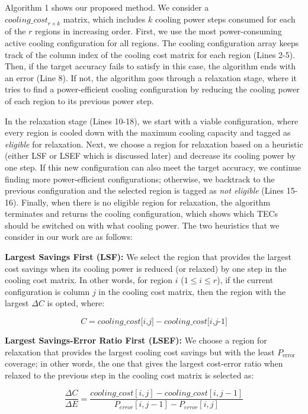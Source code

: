 \documentclass[sigconf]{acmart}
\begin{document}
Algorithm 1 shows our proposed method. We consider a \\ $\textit{cooling\_cost}_{r \times k}$ matrix, which includes \( k \) cooling power steps consumed for each of the \( r \) regions in increasing order. First, we use the most power-consuming active cooling configuration for all regions. The cooling configuration array keeps track of the column index of the cooling cost matrix for each region (Lines 2-5). Then, if the target accuracy fails to satisfy in this case, the algorithm ends with an error (Line 8). If not, the algorithm goes through a relaxation stage, where it tries to find a power-efficient cooling configuration by reducing the cooling power of each region to its previous power step.

In the relaxation stage (Lines 10-18), we start with a viable configuration, where every region is cooled down with the maximum cooling capacity and tagged as \textit{eligible} for relaxation. Next, we choose a region for relaxation based on a heuristic (either LSF or LSEF which is discussed later) and decrease its cooling power by one step. If this new configuration can also meet the target accuracy, we continue finding more power-efficient configurations; otherwise, we backtrack to the previous configuration and the selected region is tagged as \textit{not eligible} (Lines 15-16). Finally, when there is no eligible region for relaxation, the algorithm terminates and returns the cooling configuration, which shows which TECs should be switched on with what cooling power. The two heuristics that we consider in our work are as follows:

\textbf{Largest Savings First (LSF):} We select the region that provides the largest cost savings when its cooling power is reduced (or relaxed) by one step in the cooling cost matrix. In other words, for region \( i \) (\( 1 \leq i \leq r \)), if the current configuration is column \( j \) in the cooling cost matrix, then the region with the largest \( \Delta C \) is opted, where:

\[
C = \textit{cooling\_cost[i,j]} - \textit{cooling\_cost[i,j-1]} \tag{2}
\]

\textbf{Largest Savings-Error Ratio First (LSEF):} We choose a region for relaxation that provides the largest cooling cost savings but with the least \( P_{\text{error}} \) coverage; in other words, the one that gives the largest cost-error ratio when relaxed to the previous step in the cooling cost matrix is selected as:

\[
\frac{\Delta C}{\Delta E} = {\frac{\textit{cooling\_cost}[i,j] - \textit{cooling\_cost}[i,j-1]}{P_{\textit{error}}[i,j-1] - P_{\textit{error}}[i,j]}} \tag{3}
\]
\end{document}
